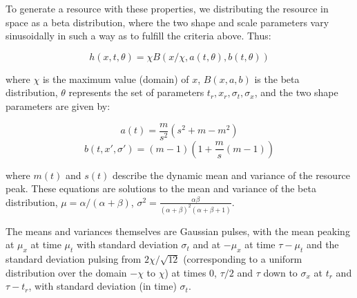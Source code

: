 \documentclass[utf8]{frontiersSCNS} %
\begin{document}
	To generate a resource with these properties, we distributing the resource in space as a beta distribution, where the two shape and scale parameters vary sinusoidally in such a way as to fulfill the criteria above.  Thus:
	
	$$h(x,t, \theta) = \chi B(x/\chi, a(t, \theta), b(t, \theta))$$
	
	where $\chi$ is the maximum value (domain) of $x$, $B(x, a, b)$ is the beta distribution, $\theta$ represents the set of parameters $t_r, x_r, \sigma_t, \sigma_x$, and the two shape parameters are given by:
	
	$$a(t) = \frac{m}{s^2}( s^2 + m - m^2)$$
	$$b(t, x', \sigma') = (m-1)\left(1 + \frac{m}{s}(m-1)\right) $$
	
	where $m(t)$ and $s(t)$ describe the dynamic mean and variance of the resource peak.  These equations are solutions to the mean and variance of the beta distribution, $\mu = \alpha/(\alpha + \beta)$, $\sigma^2 = \frac{\alpha\beta}{(\alpha+\beta)^2(\alpha+\beta+1)}$.
	
	The means and variances themselves are Gaussian pulses, with the mean peaking at $\mu_x$ at time $\mu_t$ with standard deviation $\sigma_t$ and at $-\mu_x$ at time $\tau - \mu_t$ and the standard deviation pulsing from $2 \chi/\sqrt{12}$ (corresponding to a uniform distribution over the domain $-\chi$ to $\chi$) at times 0, $\tau/2$ and $\tau$ down to $\sigma_x$ at $t_r$ and $\tau - t_r$, with standard deviation (in time) $\sigma_t$. 
	
	
\end{document}
